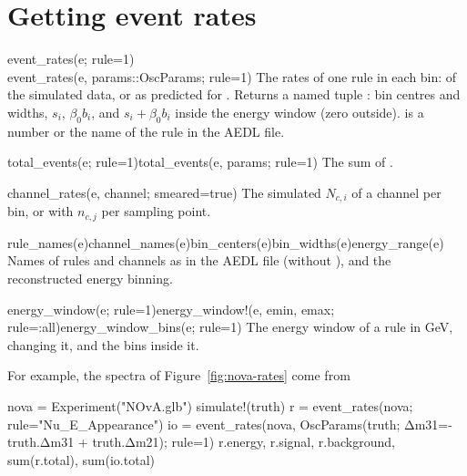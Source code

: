 \section{Getting event rates}

\begin{apifun}{event\_rates(e; rule=1)\\
event\_rates(e, params::OscParams; rule=1)}
The rates of one rule in each bin: of the simulated data, or as predicted for
. Returns a named tuple : bin centres and widths, $s_i$, $\beta_0b_i$, and
$s_i+\beta_0b_i$ inside the energy window (zero outside).  is a
number or the name of the rule in the AEDL file.
\end{apifun}
\begin{apifun}{total\_events(e; rule=1)\qquad total\_events(e, params; rule=1)}
The sum of .
\end{apifun}
\begin{apifun}{channel\_rates(e, channel; smeared=true)}
The simulated $N_{c,i}$ of a channel per bin, or with 
$n_{c,j}$ per sampling point.
\end{apifun}
\begin{apifun}{rule\_names(e)\qquad channel\_names(e)\qquad bin\_centers(e)\qquad bin\_widths(e)\qquad energy\_range(e)}
Names of rules and channels as in the AEDL file (without \code{\#}), and the
reconstructed energy binning.
\end{apifun}
\begin{apifun}{energy\_window(e; rule=1)\qquad energy\_window!(e, emin, emax; rule=:all)\qquad energy\_window\_bins(e; rule=1)}
The energy window of a rule in GeV, changing it, and the bins inside it.
\end{apifun}

\noindent For example, the spectra of Figure~\ref{fig:nova-rates} come from
\begin{julia}
nova = Experiment("NOvA.glb")
simulate!(truth)
r  = event_rates(nova; rule="Nu_E_Appearance")
io = event_rates(nova, OscParams(truth; Δm31=-truth.Δm31 + truth.Δm21); rule=1)
r.energy, r.signal, r.background, sum(r.total), sum(io.total)
\end{julia}


